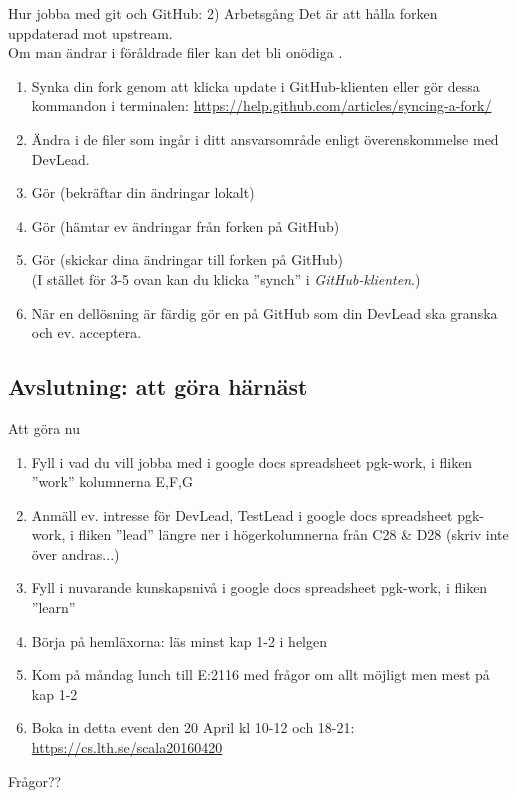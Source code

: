 \documentclass{slides}
\begin{document}
\begin{Slide}{Hur jobba med git och GitHub: 2) Arbetsgång}\footnotesize
Det är  att hålla forken uppdaterad mot upstream.\\
Om man ändrar i föråldrade filer kan det bli onödiga .
\begin{enumerate}
\item Synka din fork genom att klicka update i GitHub-klienten eller gör dessa kommandon i terminalen: \url{https://help.github.com/articles/syncing-a-fork/}
\item Ändra i de filer som ingår i ditt ansvarsområde enligt överenskommelse med DevLead.
\item Gör  (bekräftar din ändringar lokalt)
\item Gör  (hämtar ev ändringar från forken på GitHub)
\item Gör  (skickar dina ändringar till forken på GitHub) \\
(I stället för 3-5 ovan kan du klicka ''synch'' i \emph{GitHub-klienten}.)
\item När en dellösning är färdig gör en  på GitHub som din DevLead ska granska och ev. acceptera.  
\end{enumerate}
\end{Slide}

\subsection{Avslutning: att göra härnäst}
\begin{Slide}{Att göra nu}
\begin{enumerate}
\item Fyll i vad du vill jobba med i google docs spreadsheet pgk-work, i fliken ''work'' kolumnerna E,F,G
\item Anmäll ev. intresse för DevLead, TestLead i google docs spreadsheet pgk-work, i fliken ''lead'' längre ner i högerkolumnerna från C28 \& D28 (skriv inte över andras...)
\item Fyll i nuvarande kunskapsnivå i google docs spreadsheet pgk-work, i fliken ''learn''
\item Börja på hemläxorna: läs minst kap 1-2 i helgen
\item Kom på måndag lunch till E:2116 med frågor om allt möjligt men mest på kap 1-2 
\item Boka in detta event den 20 April kl 10-12 och 18-21: \\
\url{https://cs.lth.se/scala20160420}
\end{enumerate}
Frågor??
\end{Slide}
\end{document}
